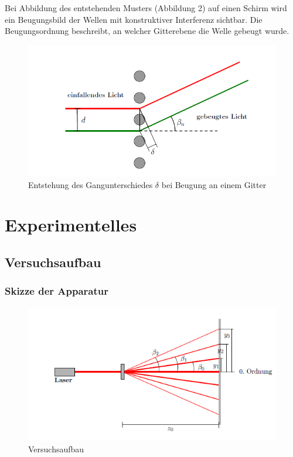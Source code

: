 \documentclass[12pt,a4paper,titlepage,headinclude,bibtotoc]{scrartcl}
\begin{document}
Bei Abbildung des entstehenden Musters (Abbildung 2) auf einen Schirm wird ein Beugungsbild der Wellen mit konstruktiver Interferenz sichtbar. Die Beugungsordnung beschreibt, an welcher Gitterebene die Welle gebeugt wurde. 

\begin{figure} [h]
\begin{center}
\includegraphics[scale=0.65]{Gangunterschied.png} \end{center}
\caption{Entstehung des Gangunterschiedes $\delta$ bei Beugung an einem Gitter}
\end{figure}

\section{Experimentelles}

\subsection{Versuchsaufbau}

\subsubsection{Skizze der Apparatur}
\begin{figure} [h]
\begin{center}
\includegraphics[scale=1]{Versuchsaufbau.png} \end{center}
\caption{Versuchsaufbau}
\end{figure}
\end{document}
